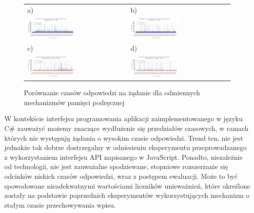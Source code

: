 \begin{figure}[htb]
  \centering
    \begin{tabular}{@{}ll@{}}
    a) & b) \\
    \includegraphics[width=0.49\textwidth]{rys05/dotnet-static-cache-chart.pdf} & \includegraphics[width=0.49\textwidth]{rys05/dotnet-freq-cache-chart.pdf} \\
    c) & d) \\
    \includegraphics[width=0.49\textwidth]{rys05/nodejs-static-cache.pdf} & \includegraphics[width=0.49\textwidth]{rys05/nodejs-freq-cache.pdf}
    \end{tabular}
  \caption{Porównanie czasów odpowiedzi na żądanie dla odmiennych mechanizmów pamięci podręcznej}
  \label{fig:cache-charts}
\end{figure}

W kontekście interfejsu programowania aplikacji zaimplementowanego w języku C\# zauważyć możemy znaczące wydłużenie się przedziałów czasowych, w ramach których nie występują żądania o wysokim czasie odpowiedzi. Trend ten, nie jest jednakże tak dobrze dostrzegalny w odniesieniu eksperymentu przeprowadzanego z wykorzystaniem interfejsu API napisanego w JavaScript. Ponadto, niezależnie od technologii, nie jest zauważalne spodziewane, stopniowe rozszerzanie się odcinków niskich czasów odpowiedzi, wraz z postępem ewaluacji. Może to być spowodowane nieadekwatnymi wartościami liczników unieważnień, które określone zostały na podstawie poprzednich eksperymentów wykorzystujących mechanizm o stałym czasie przechowywania wpisu.
